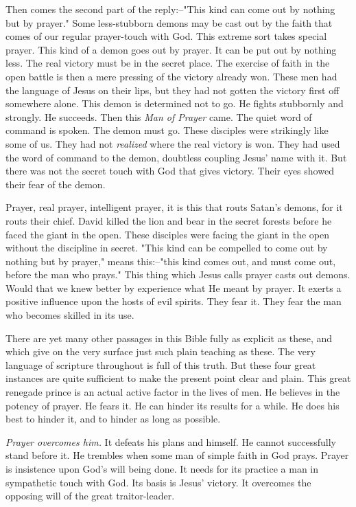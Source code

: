 Then comes the second part of the reply:--"This kind can come out by
nothing but by prayer." Some less-stubborn demons may be cast out by the
faith that comes of our regular prayer-touch with God. This extreme sort
takes special prayer. This kind of a demon goes out by prayer. It can be
put out by nothing less. The real victory must be in the secret place. The
exercise of faith in the open battle is then a mere pressing of the
victory already won. These men had the language of Jesus on their lips,
but they had not gotten the victory first off somewhere alone. This demon
is determined not to go. He fights stubbornly and strongly. He succeeds.
Then this \textit{Man of Prayer} came. The quiet word of command is spoken. The
demon must go. These disciples were strikingly like some of us. They had
not \textit{realized} where the real victory is won. They had used the word of
command to the demon, doubtless coupling Jesus' name with it. But there
was not the secret touch with God that gives victory. Their eyes showed
their fear of the demon.

Prayer, real prayer, intelligent prayer, it is this that routs Satan's
demons, for it routs their chief. David killed the lion and bear in the
secret forests before he faced the giant in the open. These disciples were
facing the giant in the open without the discipline in secret. "This kind
can be compelled to come out by nothing but by prayer," means this:--"this
kind comes out, and must come out, before the man who prays." This thing
which Jesus calls prayer casts out demons. Would that we knew better by
experience what He meant by prayer. It exerts a positive influence upon
the hosts of evil spirits. They fear it. They fear the man who becomes
skilled in its use.

There are yet many other passages in this Bible fully as explicit as
these, and which give on the very surface just such plain teaching as
these. The very language of scripture throughout is full of this truth.
But these four great instances are quite sufficient to make the present
point clear and plain. This great renegade prince is an actual active
factor in the lives of men. He believes in the potency of prayer. He fears
it. He can hinder its results for a while. He does his best to hinder it,
and to hinder as long as possible.

\textit{Prayer overcomes him.} It defeats his plans and himself. He cannot
successfully stand before it. He trembles when some man of simple faith in
God prays. Prayer is insistence upon God's will being done. It needs for
its practice a man in sympathetic touch with God. Its basis is Jesus'
victory. It overcomes the opposing will of the great traitor-leader.




